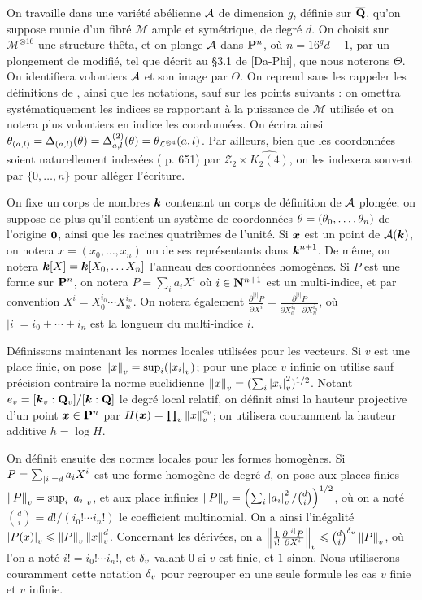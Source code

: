 On travaille dans une variété abélienne $\mathcal{A}$ de dimension $g$, définie sur $\overline{\mathbf{Q}}$, qu'on suppose munie d'un fibré $\mathcal{M}$ ample et symétrique, de degré $d$. On choisit sur $\mathcal{M}^{\otimes 16}$ une structure thêta, et on plonge $\mathcal{A}$ dans $\mathbf{P}^n$, où $n=16^g d - 1$, par un plongement de  modifié, tel que décrit au §3.1 de [Da-Phi], que nous noterons $\Theta$. On identifiera volontiers $\mathcal{A}$ et son image par $\Theta$. On reprend sans les rappeler les définitions de , ainsi que les notations, sauf sur les points suivants : on omettra systématiquement les indices se rapportant à la puissance de $\mathcal{M}$ utilisée et on notera plus volontiers en indice les coordonnées. On écrira ainsi $\theta_{(a, l)} = \Delta_{(a, l)}(\theta)  = \Delta_{a, l}^{(2)}(\theta) = \theta_{\mathcal{L}^{\otimes 4}}(a, l)$. Par ailleurs, bien que les coordonnées soient naturellement indexées ( p. 651) par $\mathcal{Z}_2 \times \widehat{K_2(4)}$, on les indexera souvent par $\{0, \dots, n\}$ pour alléger l'écriture.

On fixe un corps de nombres $\boldsymbol{k}$ contenant un corps de définition de $\mathcal{A}$ plongée; on suppose de plus qu'il contient un système de coordonnées $\theta = (\theta_0,\dots,\theta_n)$ de l'origine ${\boldsymbol{0}}$, ainsi que les racines quatrièmes de l'unité. Si ${\boldsymbol{x}}$ est un point de $\mathcal{A}(\boldsymbol{k})$, on notera $x = (x_0, \dots, x_n)$ un de ses représentants dans $\boldsymbol{k}^{n+1}$. De même, on notera $\boldsymbol{k}[X] = \boldsymbol{k}[X_0, \dots X_n]$ l'anneau des coordonnées homogènes. Si $P$ est une forme sur $\mathbf{P}^n$, on notera $P= \sum_i a_i X^i$ où $i \in \mathbf{N}^{n+1}$ est un multi-indice, et par convention $X^i = X_0^{i_0}\cdots X_n^{i_n}$. On notera également $\frac{\partial^{|i|} P}{\partial X^i} = \frac{\partial^{|i|} P}{\partial X_0^{i_0}\cdots \partial X_n^{i_n}}$, où $|i| = i_0 + \cdots + i_n$ est la longueur du multi-indice $i$.

Définissons maintenant les normes locales utilisées pour les vecteurs. Si $v$ est une place finie, on pose $\left\lVert x\right\rVert_{v} = \sup_i(\left\lvert x_i\right\rvert_{v})$; pour une place $v$ infinie on utilise sauf précision contraire la norme euclidienne $\left\lVert x\right\rVert_{v} = ( \sum_i \left\lvert x_i\right\rvert_{v}^2 )^{1/2}$. Notant $e_v = [\boldsymbol{k}_v : \mathbf{Q}_v]/[\boldsymbol{k} : \mathbf{Q}]$ le degré local relatif, on définit ainsi la hauteur projective d'un point ${\boldsymbol{x}} \in \mathbf{P}^n$ par $H({\boldsymbol{x}}) = \prod_v \left\lVert x\right\rVert_{v}^{e_v}$; on utilisera couramment la hauteur additive $h = \log H$.

On définit ensuite des normes locales pour les formes homogènes. Si $P = \sum_{{|i|} =d} a_i X^i$ est une forme homogène de degré $d$, on pose aux places finies $\left\lVert P\right\rVert_{v} = \sup_i \left\lvert a_i\right\rvert_{v}$, et aux place infinies $\left\lVert P\right\rVert_{v} = \left( \sum_i \left\lvert a_i\right\rvert_{v}^2/\binom{d}{i} \right)^{1/2}$, où on a noté $\binom{d}{i} = d!/(i_0!\cdots i_n!)$ le coefficient multinomial. On a ainsi l'inégalité $\left\lvert P(x)\right\rvert_{v} \leqslant \left\lVert P\right\rVert_{v} \left\lVert x\right\rVert_{v}^d$. Concernant les dérivées, on a $\left\lVert\frac{1}{i!}\frac{\partial^{|i|}P}{\partial X^i}\right\rVert_{v} \leqslant \binom{d}{i}^{\delta_v} \left\lVert P\right\rVert_{v}$, où l'on a noté $i! = i_0! \cdots i_n!$, et ${\delta_v}$ valant $0$ si $v$ est finie, et $1$ sinon. Nous utiliserons couramment cette notation ${\delta_v}$ pour regrouper en une seule formule les cas $v$ finie et $v$ infinie.

